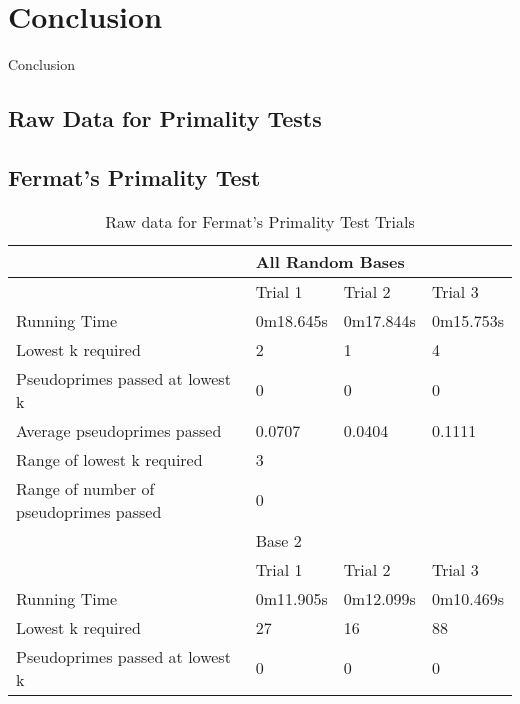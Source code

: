 \documentclass{article}
\begin{document}
\section{Conclusion}
Conclusion

\nocite{*}



\appendix
\begin{appendices}
\section{Raw Data for Primality Tests}

\subsection{Fermat's Primality Test}
\FloatBarrier
\begin{longtable}{llll}
\caption{Raw data for Fermat's Primality Test Trials\label{table:fermat}}\\ 
\toprule
                                       & \multicolumn{3}{l}{All Random Bases}  \\ \midrule
                                       & Trial 1     & Trial 2    & Trial 3    \\
Running Time                           & 0m18.645s   & 0m17.844s  & 0m15.753s  \\
Lowest k required                      & 2           & 1          & 4          \\
Pseudoprimes passed at lowest k        & 0           & 0          & 0          \\
Average pseudoprimes passed            & 0.0707      & 0.0404     & 0.1111     \\\cmidrule(lr){2-4}
Range of lowest k required             & \multicolumn{3}{l}{3}                 \\
Range of number of pseudoprimes passed & \multicolumn{3}{l}{0}                 \\\midrule
                                       & \multicolumn{3}{l}{Base 2}            \\\midrule
                                       & Trial 1     & Trial 2    & Trial 3    \\
Running Time                           & 0m11.905s   & 0m12.099s  & 0m10.469s  \\
Lowest k required                      & 27          & 16         & 88         \\
Pseudoprimes passed at lowest k        & 0           & 0          & 0          \\

\end{longtable}
\end{appendices}
\end{document}

